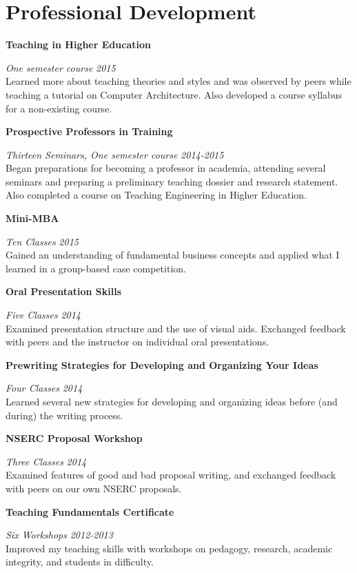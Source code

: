 \section{\sc Professional Development}

{\bf Teaching in Higher Education}
\vspace{-.3cm}

{\em One semester course} \hfill {\em 2015}\\
Learned more about teaching theories and styles and was observed by peers while teaching a tutorial on Computer Architecture.
Also developed a course syllabus for a non-existing course.

{\bf Prospective Professors in Training}
\vspace{-.3cm}

{\em Thirteen Seminars, One semester course} \hfill {\em 2014-2015}\\
Began preparations for becoming a professor in academia, attending several seminars and preparing a preliminary teaching dossier and research statement.
Also completed a course on Teaching Engineering in Higher Education.

{\bf Mini-MBA}
\vspace{-.3cm}

{\em Ten Classes} \hfill {\em 2015}\\
Gained an understanding of fundamental business concepts and applied what I learned in a group-based case competition.

{\bf Oral Presentation Skills}
\vspace{-.3cm}

{\em Five Classes} \hfill {\em 2014}\\
Examined presentation structure and the use of visual aids. Exchanged feedback with peers and the instructor on individual oral presentations.

{\bf Prewriting Strategies for Developing and Organizing Your Ideas}
\vspace{-.3cm}

{\em Four Classes} \hfill {\em 2014}\\
Learned several new strategies for developing and organizing ideas before (and during) the writing process.

{\bf NSERC Proposal Workshop}
\vspace{-.3cm}

{\em Three Classes} \hfill {\em 2014}\\
Examined features of good and bad proposal writing, and exchanged feedback with peers on our own NSERC proposals.

{\bf Teaching Fundamentals Certificate}
\vspace{-.3cm}

{\em Six Workshops} \hfill {\em 2012-2013}\\
Improved my teaching skills with workshops on pedagogy, research, academic integrity, and students in difficulty.
